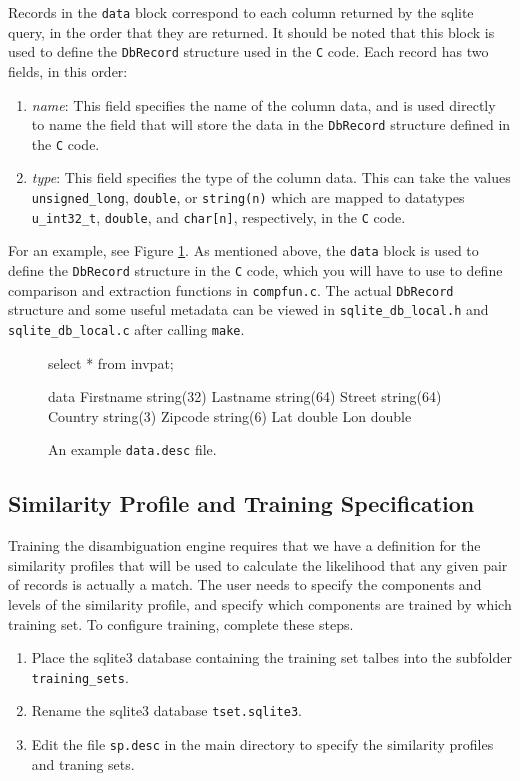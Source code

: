 \documentclass[10pt, letterpaper]{article}
\begin{document}
Records in the \texttt{data} block correspond to each column returned by the sqlite query, in the order that they are returned.
It should be noted that this block is used to define the \texttt{DbRecord} structure used in the \texttt{C} code.
Each record has two fields, in this order:
\begin{enumerate}
\item \emph{name}: This field specifies the name of the column data, and is used directly to name the field
that will store the data in the \texttt{DbRecord} structure defined in the \texttt{C} code. 
\item \emph{type}: This field specifies the type of the column data. This can take the values \texttt{unsigned\_long}, \texttt{double}, or \texttt{string(n)} which
are mapped to datatypes \texttt{u\_int32\_t}, \texttt{double}, and \texttt{char[n]}, respectively, in the \texttt{C} code.
\end{enumerate}
For an example, see Figure \ref{datadesc}. As mentioned above, the \texttt{data} block is used to define the \texttt{DbRecord} structure in the \texttt{C} code, which
you will have to use to define comparison and extraction functions in \texttt{compfun.c}. The actual \texttt{DbRecord} structure and some useful metadata
can be viewed in \texttt{sqlite\_db\_local.h} and \texttt{sqlite\_db\_local.c} after calling \texttt{make}.
\begin{figure}[!h]
\caption{An example \texttt{data.desc} file.\label{datadesc}}
\begin{verbatimtab}
select * from invpat;

data{
    Firstname string(32)
    Lastname  string(64)
    Street    string(64)
    Country   string(3)
    Zipcode   string(6)
    Lat       double
    Lon       double
}
\end{verbatimtab}
\end{figure}

\subsection{Similarity Profile and Training Specification}
Training the disambiguation engine requires that we have a definition for the similarity profiles that will be used to calculate the likelihood that any given pair of records is actually
a match. The user needs to specify the components and levels of the similarity profile, and specify which components are trained by which training set.
To configure training, complete these steps.
\begin{enumerate}
\item Place the sqlite3 database containing the training set talbes into the subfolder \texttt{training\_sets}.
\item Rename the sqlite3 database \texttt{tset.sqlite3}.
\item Edit the file \texttt{sp.desc} in the main directory to specify the similarity profiles and traning sets.
\end{enumerate}
\end{document}
